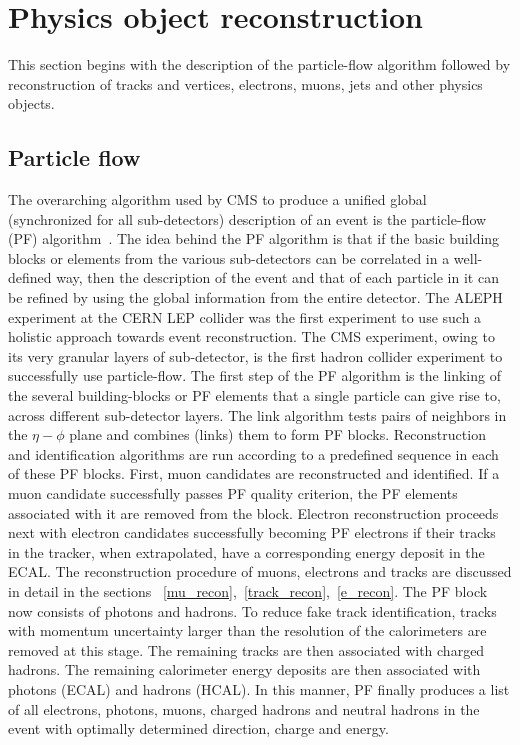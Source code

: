 \section{Physics object reconstruction}
\label{p_ob_recon}
This section begins with the description of the particle-flow algorithm followed by reconstruction of tracks and vertices, electrons, muons, jets and other physics objects.  
\subsection{Particle flow}
\label{p_flow}
The overarching algorithm used by CMS to produce a unified global (synchronized for all sub-detectors) description of an event is the particle-flow (PF) algorithm~\cite{Sirunyan:2017ulk}. The idea behind the PF algorithm is that if the basic building blocks or elements from the various sub-detectors can be correlated in a well-defined way, then the description of the event and that of each particle in it can be refined by using the global information from the entire detector. The ALEPH experiment at the CERN LEP collider was the first experiment to use such a holistic approach towards event reconstruction. The CMS experiment, owing to its very  granular layers of sub-detector, is the first hadron collider experiment to successfully use particle-flow. The first step of the PF algorithm is the linking of the several building-blocks or PF elements that a single particle can give rise to, across different sub-detector layers. The link algorithm tests pairs of neighbors in the $\eta-\phi$ plane and combines (links) them to form PF blocks. Reconstruction and identification algorithms are run according to a predefined sequence in each of these PF blocks. First, muon candidates are reconstructed and identified. If a muon candidate successfully passes PF quality criterion, the PF elements associated with it are removed from the block. Electron reconstruction proceeds next with electron candidates successfully becoming PF electrons  if their tracks in the tracker, when extrapolated,  have a corresponding energy deposit in the ECAL. The reconstruction procedure of muons, electrons and tracks are discussed in detail in the sections ~\ref{mu_recon},~\ref{track_recon},~\ref{e_recon}. The PF block now consists of photons and hadrons. To reduce fake track identification, tracks with momentum uncertainty larger than the resolution of the calorimeters are removed at this stage. The remaining tracks are then associated with charged hadrons. The remaining calorimeter energy deposits are then associated with photons (ECAL) and hadrons (HCAL). In this manner, PF finally produces a list of all electrons, photons, muons, charged hadrons and neutral hadrons in the event with optimally determined direction, charge and energy.          



